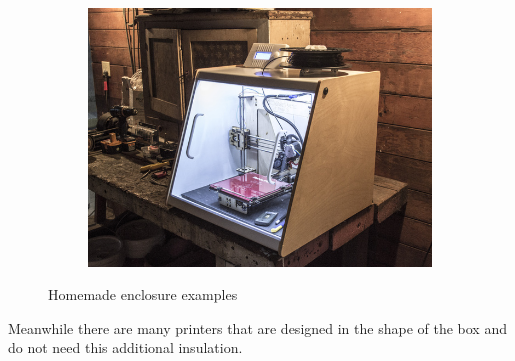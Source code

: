 \documentclass[11pt,a4paper]{article}
\begin{document}
\begin{figure}[H]
\begin{subfigure}[b]{0.3\textwidth}
    \end{subfigure}
    \quad %
    \begin{subfigure}[b]{0.3\textwidth}
        \includegraphics[width=\textwidth,cfbox=azul_marcos 4pt 0pt]{FOTOS/CERRAMIENTO3}
    \end{subfigure}
    \caption*{Homemade enclosure examples}
\end{figure}
Meanwhile there are many printers that are designed in the shape of the box and do not need this additional insulation.
\end{document}
